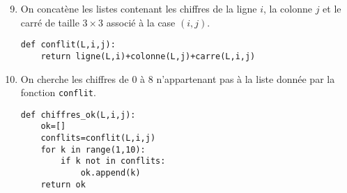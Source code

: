\documentclass[a4paper,9pt]{report}
\begin{document}
\begin{enumerate}
\setcounter{enumi}{8}
\item On concatène les listes contenant les chiffres de la ligne $i$, la colonne $j$ et le carré de taille $3 \times 3$ associé à la case $(i,j)$.

\begin{center}
\begin{minipage}{0.7\textwidth}
		
\begin{lstlisting}
def conflit(L,i,j):
    return ligne(L,i)+colonne(L,j)+carre(L,i,j)
\end{lstlisting}

\end{minipage}
\end{center}
\item On cherche les chiffres de $0$ à $8$ n'appartenant pas à la liste donnée par la fonction {\tt conflit}.

\begin{center}
\begin{minipage}{0.7\textwidth}
		
\begin{lstlisting}
def chiffres_ok(L,i,j):
    ok=[]
    conflits=conflit(L,i,j)
    for k in range(1,10):
        if k not in conflits:
            ok.append(k)
    return ok
\end{lstlisting}

\end{minipage}
\end{center}
\end{enumerate}


\medskip

\begin{center}
\end{center}

\medskip
\end{document}
